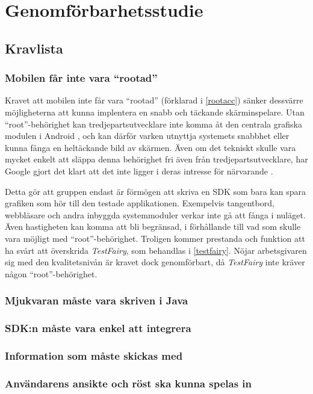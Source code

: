 \section{Genomförbarhetsstudie}
\subsection{Kravlista}
\subsubsection{Mobilen får inte vara ``rootad''}
Kravet att mobilen inte får vara ``rootad'' (förklarad i \ref{rootacc}) sänker dessvärre möjligheterna att kunna implentera en snabb och täckande skärminspelare. Utan ``root''-behörighet kan tredjepartsutvecklare inte komma åt den centrala grafiska modulen i Android \parencite{adoc}, och kan därför varken utnyttja systemets snabbhet eller kunna fånga en heltäckande bild av skärmen. Även om det tekniskt skulle vara mycket enkelt att släppa denna behörighet fri även från tredjepartsutvecklare, har Google gjort det klart att det inte ligger i deras intresse för närvarande \parencite{uhno}.

Detta gör att gruppen endast är förmögen att skriva en SDK som bara kan spara grafiken som hör till den testade applikationen. Exempelvis tangentbord, webbläsare och andra inbyggda systemmoduler verkar inte gå att fånga i nuläget. Även hastigheten kan komma att bli begränsad, i förhållande till vad som skulle vara möjligt med ``root''-behörighet. Troligen kommer prestanda och funktion att ha svårt att överskrida \textit{TestFairy}, som behandlas i \ref{testfairy}. Nöjar arbetsgivaren sig med den kvalitetsnivån är kravet dock genomförbart, då \textit{TestFairy} inte kräver någon ``root''-behörighet.

\subsubsection{Mjukvaran måste vara skriven i Java}
\subsubsection{SDK:n måste vara enkel att integrera}
\subsubsection{Information som måste skickas med}
\subsubsection{Användarens ansikte och röst ska kunna spelas in}
